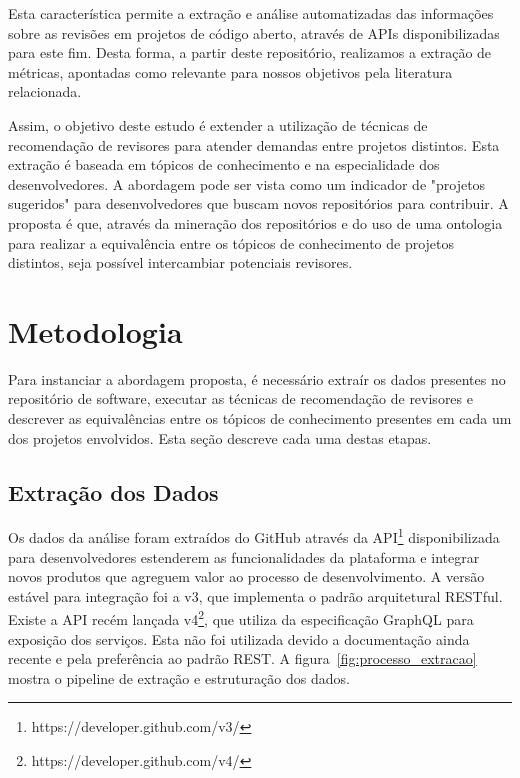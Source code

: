 \documentclass[sigconf]{acmart}
\begin{document}
Esta característica permite a extração e análise automatizadas das informações sobre as revisões em projetos de código aberto, através de APIs disponibilizadas para este fim. Desta forma, a partir deste repositório, realizamos a extração de métricas, apontadas como relevante para nossos objetivos pela literatura relacionada.

Assim, o objetivo deste estudo é extender a utilização de técnicas de recomendação de revisores para atender demandas entre projetos distintos. Esta extração é baseada em tópicos de conhecimento e na especialidade dos desenvolvedores. A abordagem pode ser vista como um indicador de "projetos sugeridos" para desenvolvedores que buscam novos repositórios para contribuir. A proposta é que, através da mineração dos repositórios e do uso de uma ontologia para realizar a equivalência entre os tópicos de conhecimento de projetos distintos, seja possível intercambiar potenciais revisores.

\section{Metodologia}

Para instanciar a abordagem proposta, é necessário extraír os dados presentes no repositório de software, executar as técnicas de recomendação de revisores e descrever as equivalências entre os tópicos de conhecimento presentes em cada um dos projetos envolvidos. Esta seção descreve cada uma destas etapas.

\subsection{Extração dos Dados}

Os dados da análise foram extraídos do GitHub através da API\footnote{https://developer.github.com/v3/} disponibilizada para desenvolvedores estenderem as funcionalidades da plataforma e integrar novos produtos que agreguem valor ao processo de desenvolvimento. A versão estável para integração foi a v3, que implementa o padrão arquitetural RESTful\cite{fielding2002}. Existe a API recém lançada v4\footnote{https://developer.github.com/v4/}, que utiliza da especificação GraphQL para exposição dos serviços. Esta não foi utilizada devido a documentação ainda recente e pela preferência ao padrão REST. A figura~\ref{fig:processo_extracao} mostra o pipeline de extração e estruturação dos dados.
\end{document}
